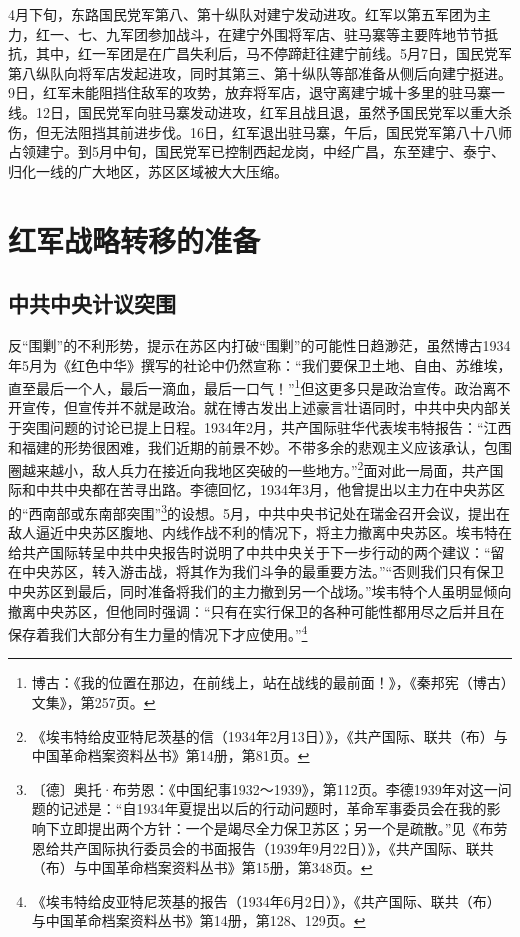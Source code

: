 4月下旬，东路国民党军第八、第十纵队对建宁发动进攻。红军以第五军团为主力，红一、七、九军团参加战斗，在建宁外围将军店、驻马寨等主要阵地节节抵抗，其中，红一军团是在广昌失利后，马不停蹄赶往建宁前线。5月7日，国民党军第八纵队向将军店发起进攻，同时其第三、第十纵队等部准备从侧后向建宁挺进。9日，红军未能阻挡住敌军的攻势，放弃将军店，退守离建宁城十多里的驻马寨一线。12日，国民党军向驻马寨发动进攻，红军且战且退，虽然予国民党军以重大杀伤，但无法阻挡其前进步伐。16日，红军退出驻马寨，午后，国民党军第八十八师占领建宁。到5月中旬，国民党军已控制西起龙岗，中经广昌，东至建宁、泰宁、归化一线的广大地区，苏区区域被大大压缩。

\section{红军战略转移的准备}

\subsection{中共中央计议突围}


反“围剿”的不利形势，提示在苏区内打破“围剿”的可能性日趋渺茫，虽然博古1934年5月为《红色中华》撰写的社论中仍然宣称：“我们要保卫土地、自由、苏维埃，直至最后一个人，最后一滴血，最后一口气！”\footnote{博古：《我的位置在那边，在前线上，站在战线的最前面！》，《秦邦宪（博古）文集》，第257页。}但这更多只是政治宣传。政治离不开宣传，但宣传并不就是政治。就在博古发出上述豪言壮语同时，中共中央内部关于突围问题的讨论已提上日程。1934年2月，共产国际驻华代表埃韦特报告：“江西和福建的形势很困难，我们近期的前景不妙。不带多余的悲观主义应该承认，包围圈越来越小，敌人兵力在接近向我地区突破的一些地方。”\footnote{《埃韦特给皮亚特尼茨基的信（1934年2月13日）》，《共产国际、联共（布）与中国革命档案资料丛书》第14册，第81页。}面对此一局面，共产国际和中共中央都在苦寻出路。李德回忆，1934年3月，他曾提出以主力在中央苏区的“西南部或东南部突围”\footnote{〔德〕奥托·布劳恩：《中国纪事1932～1939》，第112页。李德1939年对这一问题的记述是：“自1934年夏提出以后的行动问题时，革命军事委员会在我的影响下立即提出两个方针：一个是竭尽全力保卫苏区；另一个是疏散。”见《布劳恩给共产国际执行委员会的书面报告（1939年9月22日）》，《共产国际、联共（布）与中国革命档案资料丛书》第15册，第348页。}的设想。5月，中共中央书记处在瑞金召开会议，提出在敌人逼近中央苏区腹地、内线作战不利的情况下，将主力撤离中央苏区。埃韦特在给共产国际转呈中共中央报告时说明了中共中央关于下一步行动的两个建议：“留在中央苏区，转入游击战，将其作为我们斗争的最重要方法。”“否则我们只有保卫中央苏区到最后，同时准备将我们的主力撤到另一个战场。”埃韦特个人虽明显倾向撤离中央苏区，但他同时强调：“只有在实行保卫的各种可能性都用尽之后并且在保存着我们大部分有生力量的情况下才应使用。”\footnote{《埃韦特给皮亚特尼茨基的报告（1934年6月2日）》，《共产国际、联共（布）与中国革命档案资料丛书》第14册，第128、129页。}


